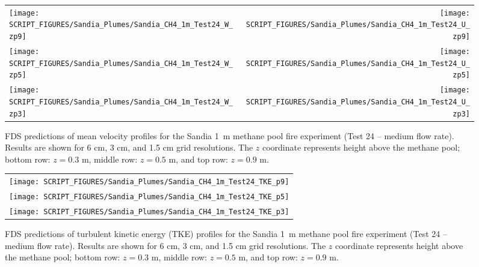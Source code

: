 \begin{figure}[p]
\begin{tabular*}{\textwidth}{l@{\extracolsep{\fill}}r}
\texttt{[image: SCRIPT\_FIGURES/Sandia\_Plumes/Sandia\_CH4\_1m\_Test24\_W\_zp9]} &
\texttt{[image: SCRIPT\_FIGURES/Sandia\_Plumes/Sandia\_CH4\_1m\_Test24\_U\_zp9]} \\
\texttt{[image: SCRIPT\_FIGURES/Sandia\_Plumes/Sandia\_CH4\_1m\_Test24\_W\_zp5]} &
\texttt{[image: SCRIPT\_FIGURES/Sandia\_Plumes/Sandia\_CH4\_1m\_Test24\_U\_zp5]} \\
\texttt{[image: SCRIPT\_FIGURES/Sandia\_Plumes/Sandia\_CH4\_1m\_Test24\_W\_zp3]} &
\texttt{[image: SCRIPT\_FIGURES/Sandia\_Plumes/Sandia\_CH4\_1m\_Test24\_U\_zp3]}
\end{tabular*}
\caption[Sandia 1~m methane pool fire (Test 24) mean velocity profiles]
{FDS predictions of mean velocity profiles for the Sandia 1~m methane pool fire experiment (Test 24 -- medium flow rate). Results are shown for 6 cm, 3 cm, and 1.5 cm grid resolutions. The $z$ coordinate represents height above the methane pool; bottom row: $z=0.3$ m, middle row: $z=0.5$ m, and top row: $z=0.9$ m.}
\label{Sandia_CH4_1m_Test24_velocity}
\end{figure}

\begin{figure}[p]
\begin{center}
\begin{tabular}{c}
\texttt{[image: SCRIPT\_FIGURES/Sandia\_Plumes/Sandia\_CH4\_1m\_Test24\_TKE\_p9]} \\
\texttt{[image: SCRIPT\_FIGURES/Sandia\_Plumes/Sandia\_CH4\_1m\_Test24\_TKE\_p5]} \\
\texttt{[image: SCRIPT\_FIGURES/Sandia\_Plumes/Sandia\_CH4\_1m\_Test24\_TKE\_p3]}
\end{tabular}
\caption[Sandia 1~m methane pool fire (Test 24) turbulent kinetic energy]
{FDS predictions of turbulent kinetic energy (TKE) profiles for the Sandia 1~m methane pool fire experiment (Test 24 -- medium flow rate). Results are shown for 6 cm, 3 cm, and 1.5 cm grid resolutions. The $z$ coordinate represents height above the methane pool; bottom row: $z=0.3$ m, middle row: $z=0.5$ m, and top row: $z=0.9$ m.}
\label{Sandia_CH4_1m_Test24_tke}
\end{center}
\end{figure}


